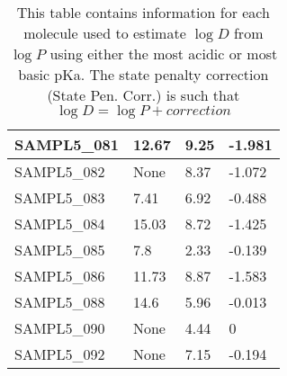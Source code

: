 \documentclass{article}
\begin{document}
\begin{table}[]
\begin{tabular}{|l|l|l|l|}
SAMPL5\_081 & 12.67          & 9.25          & -1.981           \\ \hline
SAMPL5\_082 & None           & 8.37          & -1.072           \\ \hline
SAMPL5\_083 & 7.41           & 6.92          & -0.488           \\ \hline
SAMPL5\_084 & 15.03          & 8.72          & -1.425           \\ \hline
SAMPL5\_085 & 7.8            & 2.33          & -0.139           \\ \hline
SAMPL5\_086 & 11.73          & 8.87          & -1.583           \\ \hline
SAMPL5\_088 & 14.6           & 5.96          & -0.013           \\ \hline
SAMPL5\_090 & None           & 4.44          & 0                \\ \hline
SAMPL5\_092 & None           & 7.15          & -0.194           \\ \hline
\end{tabular}
\label{corrections}
\caption{This table contains information for each molecule used to estimate $\log D$ from $\log P$ using either the most acidic or most basic pKa. The state penalty correction (State Pen. Corr.) is such that $\log D = \log P + correction$}
\end{table}
\end{document}
